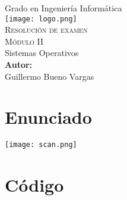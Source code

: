 \documentclass[12pt,letterpaper]{article}
\author{Guillermo Bueno}
\begin{document}
	
	\begin{titlepage}
		
		\begin{center}
			
			{\Large {Grado en Ingeniería Informática } }
			\\[1cm]
			
			
			\texttt{[image: logo.png]}
			\\[1cm]
			
			{\Huge \textsc{Resolución de examen\\[0.3cm]
					Módulo II}}\\[0.7cm]
			{\Huge Sistemas Operativos}\\[2cm]
			
			
			
			\textbf{\textsf{Autor:}}\\
			\linespread{1}
			\large Guillermo Bueno Vargas
			\\[1cm]
			
			
			
			
			
		\end{center}
		
	\end{titlepage}
	
	\tableofcontents
	
	\section{Enunciado}
	
	\texttt{[image: scan.png]}
	
	\section{Código}
	
	
	
	
	
\end{document}
